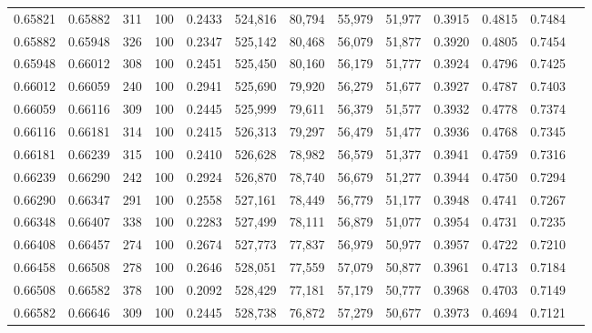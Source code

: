\begin{tabular}{rrrrrrrrrrrrr}
0.65821 & 0.65882 &   311 & 100 &                                     0.2433 & 524,816 &  80,794 &  55,979 &  51,977 & 0.3915 & 0.4815 & 0.7484 \\
0.65882 & 0.65948 &   326 & 100 &                                     0.2347 & 525,142 &  80,468 &  56,079 &  51,877 & 0.3920 & 0.4805 & 0.7454 \\
0.65948 & 0.66012 &   308 & 100 &                                     0.2451 & 525,450 &  80,160 &  56,179 &  51,777 & 0.3924 & 0.4796 & 0.7425 \\
0.66012 & 0.66059 &   240 & 100 &                                     0.2941 & 525,690 &  79,920 &  56,279 &  51,677 & 0.3927 & 0.4787 & 0.7403 \\
0.66059 & 0.66116 &   309 & 100 &                                     0.2445 & 525,999 &  79,611 &  56,379 &  51,577 & 0.3932 & 0.4778 & 0.7374 \\
0.66116 & 0.66181 &   314 & 100 &                                     0.2415 & 526,313 &  79,297 &  56,479 &  51,477 & 0.3936 & 0.4768 & 0.7345 \\
0.66181 & 0.66239 &   315 & 100 &                                     0.2410 & 526,628 &  78,982 &  56,579 &  51,377 & 0.3941 & 0.4759 & 0.7316 \\
0.66239 & 0.66290 &   242 & 100 &                                     0.2924 & 526,870 &  78,740 &  56,679 &  51,277 & 0.3944 & 0.4750 & 0.7294 \\
0.66290 & 0.66347 &   291 & 100 &                                     0.2558 & 527,161 &  78,449 &  56,779 &  51,177 & 0.3948 & 0.4741 & 0.7267 \\
0.66348 & 0.66407 &   338 & 100 &                                     0.2283 & 527,499 &  78,111 &  56,879 &  51,077 & 0.3954 & 0.4731 & 0.7235 \\
0.66408 & 0.66457 &   274 & 100 &                                     0.2674 & 527,773 &  77,837 &  56,979 &  50,977 & 0.3957 & 0.4722 & 0.7210 \\
0.66458 & 0.66508 &   278 & 100 &                                     0.2646 & 528,051 &  77,559 &  57,079 &  50,877 & 0.3961 & 0.4713 & 0.7184 \\
0.66508 & 0.66582 &   378 & 100 &                                     0.2092 & 528,429 &  77,181 &  57,179 &  50,777 & 0.3968 & 0.4703 & 0.7149 \\
0.66582 & 0.66646 &   309 & 100 &                                     0.2445 & 528,738 &  76,872 &  57,279 &  50,677 & 0.3973 & 0.4694 & 0.7121 \\

\end{tabular}
